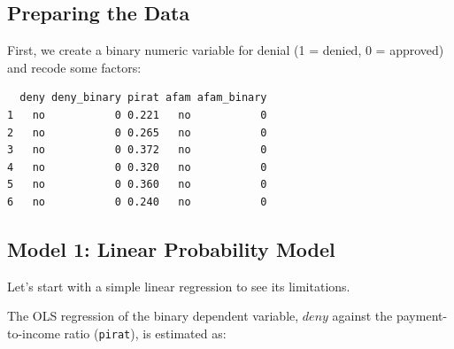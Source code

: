 \documentclass[
  12pt,
  letterpaper,
]{scrbook}
\newenvironment{Shaded}{\begin{snugshade}}{\end{snugshade}}
\newcommand{\CommentTok}[1]{\textcolor[rgb]{0.37,0.37,0.37}{#1}}
\newcommand{\DecValTok}[1]{\textcolor[rgb]{0.68,0.00,0.00}{#1}}
\newcommand{\FunctionTok}[1]{\textcolor[rgb]{0.28,0.35,0.67}{#1}}
\newcommand{\NormalTok}[1]{\textcolor[rgb]{0.00,0.23,0.31}{#1}}
\newcommand{\OtherTok}[1]{\textcolor[rgb]{0.00,0.23,0.31}{#1}}
\newcommand{\SpecialCharTok}[1]{\textcolor[rgb]{0.37,0.37,0.37}{#1}}
\newcommand{\StringTok}[1]{\textcolor[rgb]{0.13,0.47,0.30}{#1}}
\theoremstyle{definition}
\theoremstyle{plain}
\theoremstyle{remark}
\begin{document}
\subsection{Preparing the Data}\label{preparing-the-data}

First, we create a binary numeric variable for denial (1 = denied, 0 =
approved) and recode some factors:

\begin{Shaded}
\end{Shaded}

\begin{verbatim}
  deny deny_binary pirat afam afam_binary
1   no           0 0.221   no           0
2   no           0 0.265   no           0
3   no           0 0.372   no           0
4   no           0 0.320   no           0
5   no           0 0.360   no           0
6   no           0 0.240   no           0
\end{verbatim}

\subsection{Model 1: Linear Probability
Model}\label{model-1-linear-probability-model}

Let's start with a simple linear regression to see its limitations.

The OLS regression of the binary dependent variable, \(deny\) against
the payment-to-income ratio (\texttt{pirat}), is estimated as:
\end{document}
